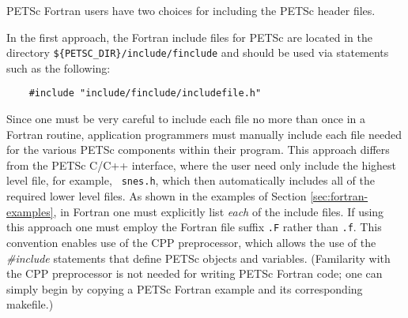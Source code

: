 {PETSc Fortran users have two choices for including the PETSc header 
files. 

\medskip

In the first  approach, 
the Fortran include files for PETSc are located in the directory 
{\tt \$\{PETSC\_DIR\}/include/finclude} and should be used via statements 
such as the following:
\begin{verbatim}
    #include "include/finclude/includefile.h"
\end{verbatim}
Since one must be very careful to include each file no more than once
in a Fortran routine, application programmers must manually include
each file needed for the various PETSc components within their
program.  This approach differs from the PETSc C/C++ interface, where
the user need only include the highest level file, for example, {\tt
snes.h}, which then automatically includes all of the required lower
level files.  As shown in the examples of Section
\ref{sec:fortran-examples}, in Fortran one must explicitly list {\em
each} of the include files. If using this approach one must employ
the Fortran file suffix {\tt .F}
rather than {\tt .f}.  This convention enables use of the CPP
preprocessor, which allows the use of the {\em \#include} statements
that define PETSc objects and variables. (Familarity with the CPP
preprocessor is not needed for writing PETSc Fortran code; one can simply
begin by copying a PETSc Fortran example and its corresponding
makefile.)  

\medskip

}
